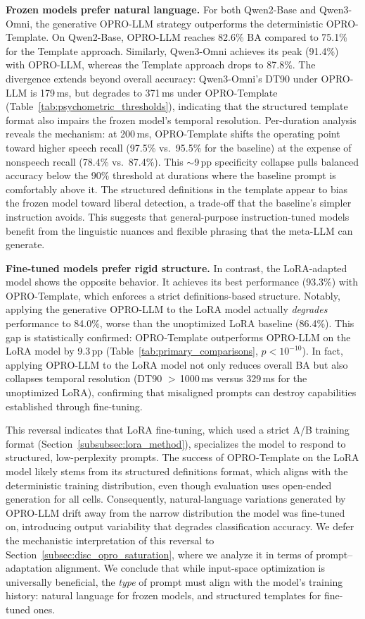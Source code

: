 \documentclass[11pt,a4paper]{article}
\begin{document}
\textbf{Frozen models prefer natural language.}
For both Qwen2-Base and Qwen3-Omni, the generative OPRO-LLM strategy outperforms the deterministic OPRO-Template. On Qwen2-Base, OPRO-LLM reaches 82.6\% BA compared to 75.1\% for the Template approach. Similarly, Qwen3-Omni achieves its peak (91.4\%) with OPRO-LLM, whereas the Template approach drops to 87.8\%. The divergence extends beyond overall accuracy: Qwen3-Omni's DT90 under OPRO-LLM is 179\,ms, but degrades to 371\,ms under OPRO-Template (Table~\ref{tab:psychometric_thresholds}), indicating that the structured template format also impairs the frozen model's temporal resolution. Per-duration analysis reveals the mechanism: at 200\,ms, OPRO-Template shifts the operating point toward higher speech recall (97.5\% vs.\ 95.5\% for the baseline) at the expense of nonspeech recall (78.4\% vs.\ 87.4\%). This $\sim$9\,pp specificity collapse pulls balanced accuracy below the 90\% threshold at durations where the baseline prompt is comfortably above it. The structured definitions in the template appear to bias the frozen model toward liberal detection, a trade-off that the baseline's simpler instruction avoids. This suggests that general-purpose instruction-tuned models benefit from the linguistic nuances and flexible phrasing that the meta-LLM can generate.

\textbf{Fine-tuned models prefer rigid structure.}
In contrast, the LoRA-adapted model shows the opposite behavior. It achieves its best performance (93.3\%) with OPRO-Template, which enforces a strict definitions-based structure. Notably, applying the generative OPRO-LLM to the LoRA model actually \emph{degrades} performance to 84.0\%, worse than the unoptimized LoRA baseline (86.4\%). This gap is statistically confirmed: OPRO-Template outperforms OPRO-LLM on the LoRA model by 9.3\,pp (Table~\ref{tab:primary_comparisons}, $p < 10^{-10}$). In fact, applying OPRO-LLM to the LoRA model not only reduces overall BA but also collapses temporal resolution (DT90 $>$\,1000\,ms versus 329\,ms for the unoptimized LoRA), confirming that misaligned prompts can destroy capabilities established through fine-tuning.

This reversal indicates that LoRA fine-tuning, which used a strict A/B training format (Section~\ref{subsubsec:lora_method}), specializes the model to respond to structured, low-perplexity prompts. The success of OPRO-Template on the LoRA model likely stems from its structured definitions format, which aligns with the deterministic training distribution, even though evaluation uses open-ended generation for all cells. Consequently, natural-language variations generated by OPRO-LLM drift away from the narrow distribution the model was fine-tuned on, introducing output variability that degrades classification accuracy. We defer the mechanistic interpretation of this reversal to Section~\ref{subsec:disc_opro_saturation}, where we analyze it in terms of prompt--adaptation alignment. We conclude that while input-space optimization is universally beneficial, the \textit{type} of prompt must align with the model's training history: natural language for frozen models, and structured templates for fine-tuned ones.
\end{document}
